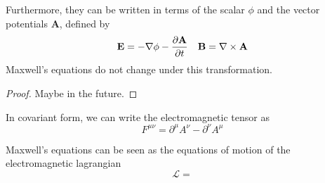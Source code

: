     Furthermore, they can be written in terms of the scalar $\phi$ and the vector potentials $\mathbf A$, defined by
    \begin{equation*}
        \mathbf E = - \nabla \phi - \frac{\partial\mathbf A}{\partial t} \quad \mathbf B = \nabla \times \mathbf A
    \end{equation*}
    Maxwell's equations do not change under this transformation. 

    \begin{proof}
        Maybe in the future.
    \end{proof}

    In covariant form, we can write the electromagnetic tensor as 
    \begin{equation*}
        F^{\mu\nu} = \partial^\mu A^\nu - \partial^\nu A^\mu
    \end{equation*}

    Maxwell's equations can be seen as the equations of motion of the electromagnetic lagrangian 
    \begin{equation*}
        \mathcal L = 
    \end{equation*}


